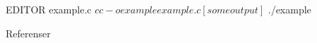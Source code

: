 \documentclass{beamer}
\begin{document}
\begin{frame}[fragile]{\insertsubsectionhead}
  \begin{terminal}
$ ${EDITOR} example.c
$ cc -o example example.c
[some output]
$ ./example
  \end{terminal}
\end{frame}



\begin{frame}[allowframebreaks]{Referenser}
  \small
  \printbibliography
\end{frame}
\end{document}
